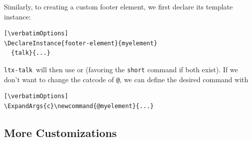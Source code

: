 \documentclass{ltugboat}
\newcommand{\verbatimOptions}{%
 \IfDocumentMetadataT{setup-code=}\small\makevmeta}
\newcommand{\ltxtalk}{\texttt{ltx-talk}}
\begin{document}
Similarly, to creating a custom footer element,
we first declare its template instance:
\begin{verbatim}[\verbatimOptions]
\DeclareInstance{footer-element}{myelement}
  {talk}{...}
\end{verbatim}
\ltxtalk\ will then use  or 
(favoring the \texttt{short} command if both exist).
If we don't want to change the catcode of \texttt{@},
we can define the desired command with
\begin{verbatim}[\verbatimOptions]
\ExpandArgs{c}\newcommand{@myelement}{...}
\end{verbatim}

\subsection{More Customizations}
\end{document}

